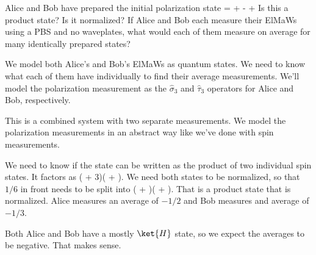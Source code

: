 \begin{example}
Alice and Bob have prepared the initial polarization state
\beq
\ket{\Psi} =  +  -  + 
\eeq
Is this a product state? Is it normalized? If Alice and Bob each measure their ElMaWs using a PBS and no waveplates, what would each of them measure on average for many identically prepared states?

\model We model both Alice's and Bob's ElMaWs as quantum states. We need to know what each of them have individually to find their average measurements. We'll model the polarization measurement as the $\hat{\sigma}_3$ and $\hat{\tau}_3$ operators for Alice and Bob, respectively.

\vis This is a combined system with two separate measurements. We model the polarization measurements in an abstract way like we've done with spin measurements.
\begin{figure}
\centering
{}
\end{figure}

\sol We need to know if the state can be written as the product of two individual spin states. It factors as
\beq
{}\left(\I{} + 3\right)\otimes\left( + \I{}\right).
\eeq
We need both states to be normalized, so that $1/6$ in front needs to be split into 
\beq
\left( + \right)\otimes\left( + \I{}\right).
\eeq
That is a product state that is normalized. Alice measures an average of $-1/2$ and Bob measures and average of $-1/3$.
\marginnote{\ref{tool:avg}}

\assess Both Alice and Bob have a mostly $\ket{H}$ state, so we expect the averages to be negative. That makes sense.

\end{example}

